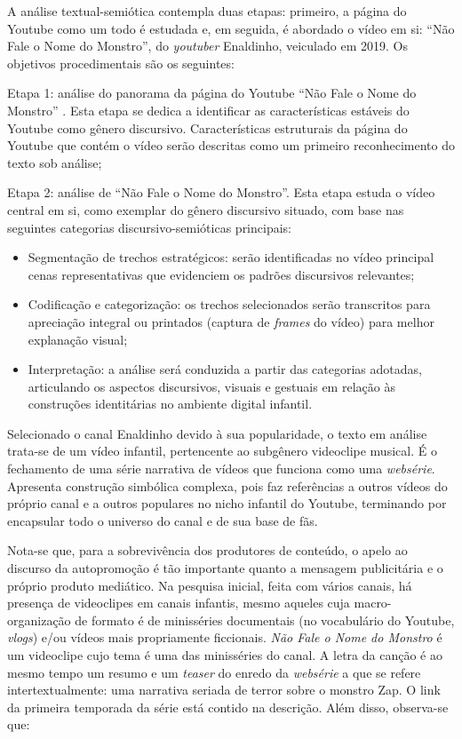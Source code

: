 \documentclass[portuguese]{textolivre}
\begin{document}
A análise textual-semiótica contempla duas etapas: primeiro, a página do Youtube como um todo é estudada e, em seguida, é abordado o vídeo em si: “Não Fale o Nome do Monstro”, do \textit{youtuber} Enaldinho, veiculado em 2019. Os objetivos procedimentais são os seguintes:

Etapa 1: análise do panorama da página do Youtube “Não Fale o Nome do Monstro” \cite{enaldinho2025naofale}. Esta etapa se dedica a identificar as características estáveis do Youtube como gênero discursivo. Características estruturais da página do Youtube que contém o vídeo serão descritas como um primeiro reconhecimento do texto sob análise;

Etapa 2: análise de “Não Fale o Nome do Monstro”. Esta etapa estuda o vídeo central em si, como exemplar do gênero discursivo situado, com base nas seguintes categorias discursivo-semióticas principais:

\begin{itemize}
    \item Segmentação de trechos estratégicos: serão identificadas no vídeo principal cenas representativas que evidenciem os padrões discursivos relevantes;
    \item Codificação e categorização: os trechos selecionados serão transcritos para apreciação integral ou printados (captura de \textit{frames} do vídeo) para melhor explanação visual;
    \item Interpretação: a análise será conduzida a partir das categorias adotadas, articulando os aspectos discursivos, visuais e gestuais em relação às construções identitárias no ambiente digital infantil.
\end{itemize}

Selecionado o canal Enaldinho devido à sua popularidade, o texto em análise trata-se de um vídeo infantil, pertencente ao subgênero videoclipe musical. É o fechamento de uma série narrativa de vídeos que funciona como uma \textit{websérie}. Apresenta construção simbólica complexa, pois faz referências a outros vídeos do próprio canal e a outros populares no nicho infantil do Youtube, terminando por encapsular todo o universo do canal e de sua base de fãs.

Nota-se que, para a sobrevivência dos produtores de conteúdo, o apelo ao discurso da autopromoção é tão importante quanto a mensagem publicitária e o próprio produto mediático. Na pesquisa inicial, feita com vários canais, há presença de videoclipes em canais infantis, mesmo aqueles cuja macro-organização de formato é de minisséries documentais (no vocabulário do Youtube, \textit{vlogs}) e/ou vídeos mais propriamente ficcionais. \textit{Não Fale o Nome do Monstro} é um videoclipe cujo tema é uma das minisséries do canal. A letra da canção é ao mesmo tempo um resumo e um \textit{teaser} do enredo da \textit{websérie} a que se refere intertextualmente: uma narrativa seriada de terror sobre o monstro Zap. O link da primeira temporada da série está contido na descrição. Além disso, observa-se que:
\end{document}
